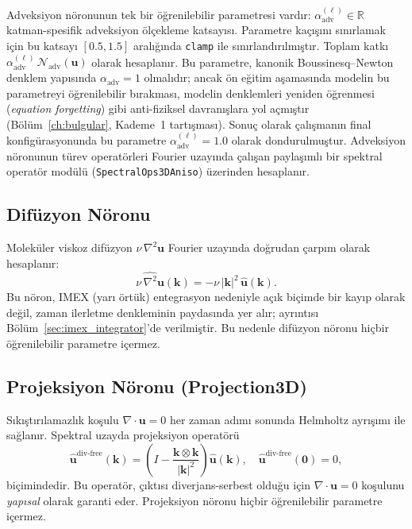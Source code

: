 Adveksiyon nöronunun tek bir öğrenilebilir parametresi vardır: $\alpha_{\mathrm{adv}}^{(\ell)} \in \mathbb{R}$ katman-spesifik adveksiyon ölçekleme katsayısı. Parametre kaçışını sınırlamak için bu katsayı $[0.5, 1.5]$ aralığında \texttt{clamp} ile sınırlandırılmıştır. Toplam katkı $\alpha_{\mathrm{adv}}^{(\ell)}\,\mathcal{N}_{\mathrm{adv}}(\mathbf{u})$ olarak hesaplanır. Bu parametre, kanonik Boussinesq--Newton denklem yapısında $\alpha_{\mathrm{adv}}=1$ olmalıdır; ancak ön eğitim aşamasında modelin bu parametreyi öğrenilebilir bırakması, modelin denklemleri yeniden öğrenmesi (\textit{equation forgetting}) gibi anti-fiziksel davranışlara yol açmıştır (Bölüm~\ref{ch:bulgular}, Kademe~1 tartışması). Sonuç olarak çalışmanın final konfigürasyonunda bu parametre $\alpha_{\mathrm{adv}}^{(\ell)} = 1.0$ olarak dondurulmuştur. Adveksiyon nöronunun türev operatörleri Fourier uzayında çalışan paylaşımlı bir spektral operatör modülü (\texttt{SpectralOps3DAniso}) üzerinden hesaplanır.

\subsection{Difüzyon Nöronu}

Moleküler viskoz difüzyon $\nu\,\nabla^{2}\mathbf{u}$ Fourier uzayında doğrudan çarpım olarak hesaplanır:
\begin{equation}
\widehat{\nu\,\nabla^{2}\mathbf{u}}(\mathbf{k}) = -\nu\,|\mathbf{k}|^{2}\,\hat{\mathbf{u}}(\mathbf{k}).
\label{eq:diffusion_fourier}
\end{equation}
Bu nöron, IMEX (yarı örtük) entegrasyon nedeniyle açık biçimde bir kayıp olarak değil, zaman ilerletme denkleminin paydasında yer alır; ayrıntısı Bölüm~\ref{sec:imex_integrator}'de verilmiştir. Bu nedenle difüzyon nöronu hiçbir öğrenilebilir parametre içermez.

\subsection{Projeksiyon Nöronu (Projection3D)}

Sıkıştırılamazlık koşulu $\nabla\cdot\mathbf{u}=0$ her zaman adımı sonunda Helmholtz ayrışımı ile sağlanır. Spektral uzayda projeksiyon operatörü
\begin{equation}
\widehat{\mathbf{u}}^{\mathrm{div\text{-}free}}(\mathbf{k})
= \left(I - \frac{\mathbf{k}\otimes\mathbf{k}}{|\mathbf{k}|^{2}}\right)\hat{\mathbf{u}}(\mathbf{k}),
\quad \widehat{\mathbf{u}}^{\mathrm{div\text{-}free}}(\mathbf{0}) = 0,
\label{eq:projection}
\end{equation}
biçimindedir. Bu operatör, çıktısı diverjans-serbest olduğu için $\nabla\cdot\mathbf{u}=0$ koşulunu \emph{yapısal} olarak garanti eder. Projeksiyon nöronu hiçbir öğrenilebilir parametre içermez.

